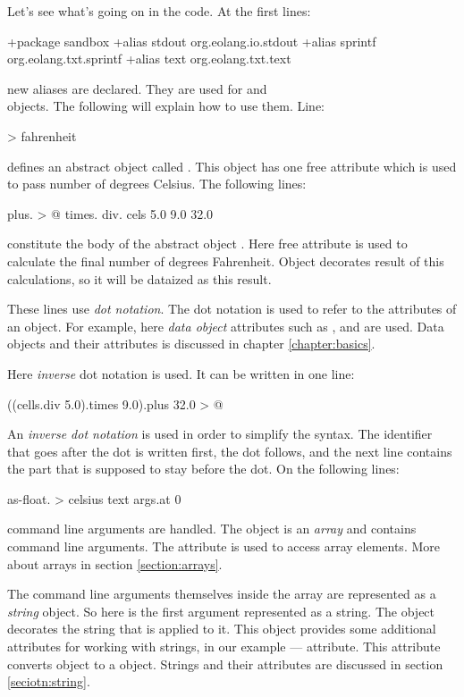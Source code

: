 \documentclass[12pt]{book}
\begin{document}
Let's see what's going on in the code. At the first lines:
\begin{ffcode}
+package sandbox
+alias stdout org.eolang.io.stdout
+alias sprintf org.eolang.txt.sprintf
+alias text org.eolang.txt.text
\end{ffcode}
new aliases are declared. They are used for  and
\\
 objects. The following will explain how to use them. Line:
\begin{ffcode}
[cels] > fahrenheit
\end{ffcode}
defines an abstract object called . This object has one free attribute  which is used to pass number of degrees Celsius. The following lines:
\begin{ffcode}
plus. > @
  times.
    div.
      cels
      5.0
    9.0
  32.0
\end{ffcode}
constitute the body of the abstract object . Here  free attribute is used to calculate the final number of degrees Fahrenheit. Object  decorates result of this calculations, so it will be dataized as this result.

These lines use \textit{dot notation}. The dot notation is used to refer to the attributes of an object. For example, here  \textit{data object} attributes such as ,  and  are used. Data objects and their attributes is discussed in chapter \ref{chapter:basics}.

Here \textit{inverse} dot notation is used. It can be written in one line:
\begin{ffcode}
((cells.div 5.0).times 9.0).plus 32.0 > @
\end{ffcode}
An \textit{inverse dot notation} is used in order to simplify the syntax. The identiﬁer that goes after the dot is written ﬁrst, the dot follows, and the next line contains the part that is supposed to stay before the dot.  On the following lines:
\begin{ffcode}
as-float. > celsius
  text
    args.at 0
\end{ffcode}
command line arguments are handled.  The  object is an \textit{array} and contains command line arguments. The attribute  is used to access array elements. More about arrays in section \ref{section:arrays}.

The command line arguments themselves inside the  array are represented as a \textit{string} object.  So here  is the first argument represented as a string. The object  decorates the string that is applied to it. This object provides some additional attributes for working with strings, in our example —  attribute. This attribute converts  object to a  object. Strings and their attributes are discussed in section \ref{seciotn:string}.
\end{document}
